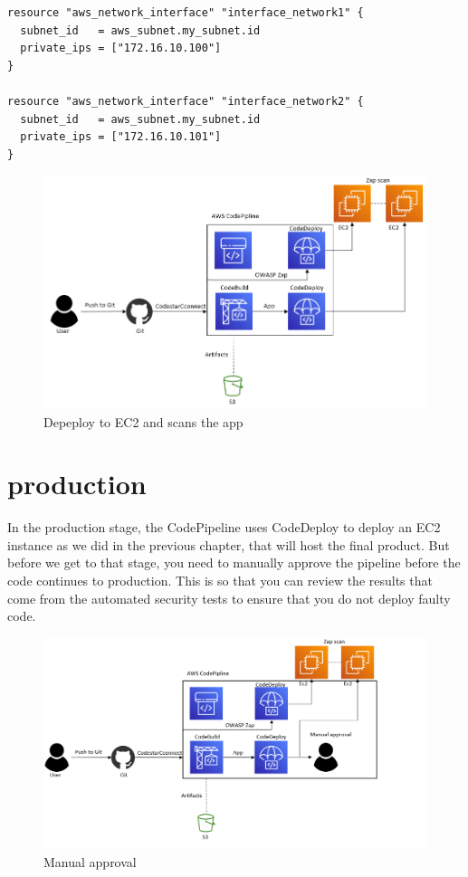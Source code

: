 \begin{tcolorbox}
\begin{verbatim}
resource "aws_network_interface" "interface_network1" {
  subnet_id   = aws_subnet.my_subnet.id
  private_ips = ["172.16.10.100"]
}

resource "aws_network_interface" "interface_network2" {
  subnet_id   = aws_subnet.my_subnet.id
  private_ips = ["172.16.10.101"]
}
\end{verbatim}
\end{tcolorbox}

\vspace{2mm}
\begin{figure}[H]
    \centering
    \includegraphics[width=0.7\columnwidth]{Images/aws-piplin-5.png}
    \caption{Depeploy to EC2 and scans the app}
    \label{fig: Depeploy to EC2 and scans the app}
\end{figure}


\section{production}

In the production stage, the CodePipeline uses CodeDeploy to deploy an EC2 instance as we did in the previous chapter, that will host the final product. But before we get to that stage, you need to manually approve the pipeline before the code continues to production. This is so that you can review the results that come from the automated security tests to ensure that you do not deploy faulty code.



\vspace{2mm}
\begin{figure}[H]
    \centering
    \includegraphics[width=0.8\columnwidth]{Images/aws-piplin-6.png}
    \caption{Manual approval}
    \label{fig: Manual approval}
\end{figure}

